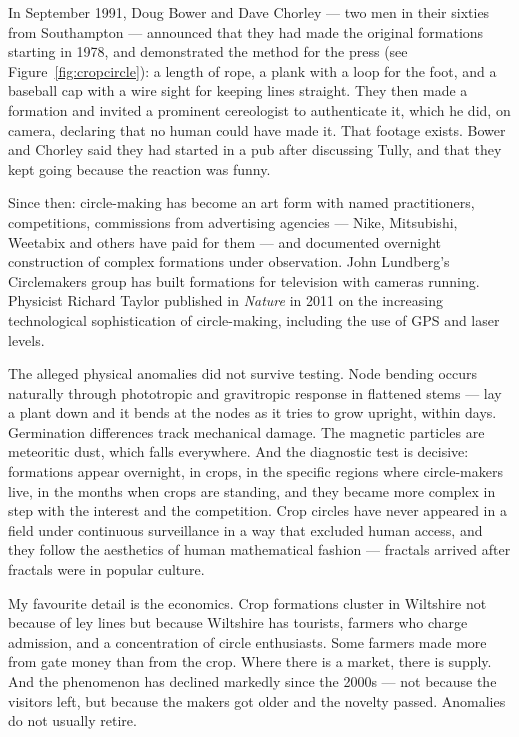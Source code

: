In September 1991, Doug Bower and Dave Chorley --- two men in their sixties from Southampton ---
announced that they had made the original formations starting in 1978, and demonstrated the method for the press (see Figure~\ref{fig:cropcircle}): a length of rope, a plank with a loop for the foot, and a baseball cap with
a wire sight for keeping lines straight. They then made a formation and invited a prominent
cereologist to authenticate it, which he did, on camera, declaring that no human could have made
it. That footage exists. Bower and Chorley said they had started in a pub after discussing
Tully, and that they kept going because the reaction was funny.

Since then: circle-making has become an art form with named practitioners, competitions,
commissions from advertising agencies --- Nike, Mitsubishi, Weetabix and others have paid for
them --- and documented overnight construction of complex formations under observation. John
Lundberg's Circlemakers group has built formations for television with cameras running. Physicist
Richard Taylor published in \emph{Nature} in 2011 on the increasing technological sophistication of
circle-making, including the use of GPS and laser levels.

The alleged physical anomalies did not survive testing. Node bending occurs naturally through
phototropic and gravitropic response in flattened stems --- lay a plant down and it bends at the
nodes as it tries to grow upright, within days. Germination differences track mechanical damage.
The magnetic particles are meteoritic dust, which falls everywhere. And the diagnostic test is
decisive: formations appear overnight, in crops, in the specific regions where circle-makers
live, in the months when crops are standing, and they became more complex in step with the
interest and the competition. Crop circles have never appeared in a field under continuous
surveillance in a way that excluded human access, and they follow the aesthetics of human
mathematical fashion --- fractals arrived after fractals were in popular culture.

\begin{funfact}
My favourite detail is the economics. Crop formations cluster in Wiltshire not because of ley
lines but because Wiltshire has tourists, farmers who charge admission, and a concentration of
circle enthusiasts. Some farmers made more from gate money than from the crop. Where there is a
market, there is supply. And the phenomenon has declined markedly since the 2000s --- not because
the visitors left, but because the makers got older and the novelty passed. Anomalies do not
usually retire.
\end{funfact}


